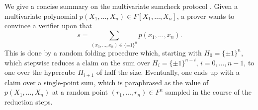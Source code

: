 \documentclass[11pt]{article}
\theoremstyle{definition}
\theoremstyle{definition}
\begin{document}
We give a concise summary on the multivariate sumcheck protocol \cite{sumcheck}.
Given a multivariate polynomial $p(X_1,\ldots, X_n)\in F[X_1,\ldots, X_n]$, a prover wants to convince a verifier upon that
\begin{equation*}
s = \sum_{(x_1,\ldots, x_n) \in \{\pm 1\}^n} p(x_1, \ldots, x_n).
\end{equation*}
This is done by a random folding procedure which, starting with $H_0=\{\pm 1\}^n$, which stepwise reduces a claim on the sum over $H_i = \{\pm 1\}^{n-i}$, $i=0,\ldots, n-1$, to one over the hypercube $H_{i+1}$ of half the size. 
Eventually, one ends up with a claim over a single-point sum, which is paraphrased as the value of $p(X_1,\ldots, X_n)$ at a random point $(r_1,\ldots, r_n)\in F^n$ sampled in the course of the reduction steps.

 
\end{document}
